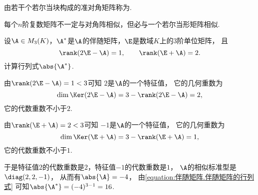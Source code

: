 \begin{definition}
由若干个若尔当块构成的准对角矩阵称为.
\end{definition}

\begin{theorem}
每个\(n\)阶复数矩阵不一定与对角阵相似，但必与一个若尔当形矩阵相似.
\end{theorem}

\begin{example}
设\(\A \in M_3(K)\)，\(\A^*\)是\(\A\)的伴随矩阵，\(\E\)是数域\(K\)上的3阶单位矩阵，
且\[
	\rank(2\E-\A) = 1,
	\qquad
	\rank(\E+\A) = 2.
\]
计算行列式\(\abs{\A^*}\).
\begin{solution}
由\(\rank(2\E-\A) = 1 < 3\)可知
\(2\)是\(\A\)的一个特征值，
它的几何重数为\[
	\dim\Ker(2\E-\A)
	= 3 - \rank(2\E-\A)
	= 2,
\]
它的代数重数不小于\(2\).

由\(\rank(\E+\A) = 2 < 3\)可知
\(-1\)是\(\A\)的一个特征值，
它的几何重数为\[
	\dim\Ker(\E+\A)
	= 3 - \rank(\E+\A)
	= 1,
\]
它的代数重数不小于\(1\).

于是特征值\(2\)的代数重数是\(2\)，特征值\(-1\)的代数重数是\(1\)，
\(\A\)的相似标准型是\(\diag(2,2,-1)\)，
从而有\(\abs{\A} = -4\)，
由\cref{equation:伴随矩阵.伴随矩阵的行列式}
可知\(\abs{\A^*} = (-4)^{3-1} = 16\).
\end{solution}
\end{example}
